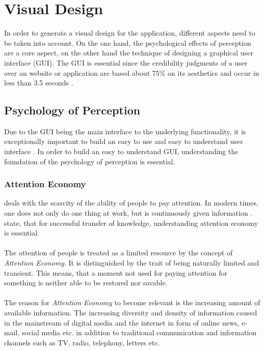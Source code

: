 \section{Visual Design}
In order to generate a visual design for the application, different aspects need to be taken into account. On the one hand, the psychological effects of perception are a core aspect, on the other hand the technique of designing a graphical user interface (GUI). The GUI is essential since the credibility judgments of a user over an website or application are based about 75\% on its aesthetics and occur in less than 3.5 seconds \parencite[cf.][1]{Alsudani.2009}.
\subsection{Psychology of Perception}
Due to the GUI being the main interface to the underlying functionality, it is exceptionally important to build an easy to use and easy to understand user interface \parencite[cf.][2]{Dray.1995}. In order to build an easy to understand GUI, understanding the foundation of the psychology of perception is essential.
\subsubsection{Attention Economy} deals with the scarcity of the ability of people to pay attention. In modern times, one does not only do one thing at work, but is continuously given information  \parencite[cf.][]{Davenport.2001}. \textcite{Davenport.2001} state, that for successful transfer of knowledge, understanding attention economy is essential. 
\paragraph*{} The attention of people is treated as a limited resource by the concept of \textit{Attention Economy}. It is distinguished by the trait of being naturally limited and transient. This means, that a moment not used for paying attention for something is neither able to be restored nor savable. \parencite[cf.][]{Davenport.2001}
\paragraph*{} The reason for \textit{Attention Economy} to become relevant is the increasing amount of available information. The increasing diversity and density of information caused in the mainstream of digital media and the internet in form of online news, e-mail, social media etc. in addition to traditional communication and information channels such as TV, radio, telephony, letters etc.
